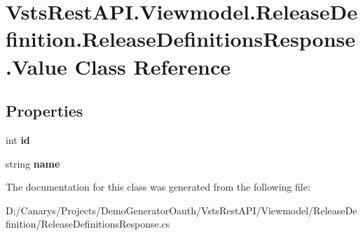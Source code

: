 \hypertarget{class_vsts_rest_a_p_i_1_1_viewmodel_1_1_release_definition_1_1_release_definitions_response_1_1_value}{}\section{Vsts\+Rest\+A\+P\+I.\+Viewmodel.\+Release\+Definition.\+Release\+Definitions\+Response.\+Value Class Reference}
\label{class_vsts_rest_a_p_i_1_1_viewmodel_1_1_release_definition_1_1_release_definitions_response_1_1_value}
\subsection*{Properties}
\begin{DoxyCompactItemize}
\item 
\mbox{\label{class_vsts_rest_a_p_i_1_1_viewmodel_1_1_release_definition_1_1_release_definitions_response_1_1_value_aa5d190fdf97f6c3d0097678b69206293}} 
int {\bfseries id}
\item 
\mbox{\label{class_vsts_rest_a_p_i_1_1_viewmodel_1_1_release_definition_1_1_release_definitions_response_1_1_value_af5e5b045406e8876aafc91a81d0f2393}} 
string {\bfseries name}
\end{DoxyCompactItemize}


The documentation for this class was generated from the following file\+:\begin{DoxyCompactItemize}
\item 
D\+:/\+Canarys/\+Projects/\+Demo\+Generator\+Oauth/\+Vsts\+Rest\+A\+P\+I/\+Viewmodel/\+Release\+Definition/Release\+Definitions\+Response.\+cs\end{DoxyCompactItemize}
